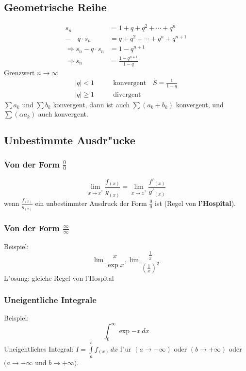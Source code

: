 \subsection{Geometrische Reihe}
\begin{align}
       s_n        & = 1 + q + q^2 + \cdots + q^n \\
-\quad q\cdot s_n & =     q + q^2 + \cdots + q^n + q^{n+1} \\
\Longrightarrow s_n - q \cdot s_n & = 1 - q^{n+1} \\
\Longrightarrow s_n & = \frac{1 - q^{n+1}}{1 -q}
\end{align}
Grenzwert $n\rightarrow\infty$
\begin{align}
  |q| < 1 \qquad & \text{konvergent}\quad S = \frac{1}{1-q} \\
  |q| \geq 1 \qquad & \text{divergent}
\end{align}
$\sum a_k$ und $\sum b_k$ konvergent, dann ist auch
$\sum (a_k+b_k)$ konvergent, und $\sum (\alpha a_k)$ auch konvergent.


\subsection{Unbestimmte Ausdr"ucke}
\subsubsection{Von der Form $\frac{0}{0}$}
\begin{equation}
  \lim_{x\to x^{*}} \frac{f_{(x)}}{g_{(x)}} = \lim_{x\to x^{*}}\frac{f'_{(x)}}{g'_{(x)}}
\end{equation}
wenn $\frac{f_{(x)}}{g_{(x)}}$ ein unbestimmter Ausdruck der Form $\frac{0}{0}$ ist
(Regel von \textbf{l'Hospital}).

\subsubsection{Von der Form $\frac{\infty}{\infty}$}
Beispiel:
\begin{equation}
  \lim_{} \frac{x}{\exp{x}}, \lim_{} \frac{\frac{1}{x}}{\left(\frac{1}{x}\right)^2}
\end{equation}
L"osung: gleiche Regel von l'Hospital


\subsubsection{Uneigentliche Integrale}
Beispiel:
\begin{equation}
  \int_0^\infty \exp{-x}\,dx
\end{equation}
Uneigentliches Integral: $I=\int\limits_a^b f_{(x)}\,dx$ f"ur $(a\rightarrow -\infty)$
oder $(b\rightarrow +\infty)$ oder $(a\rightarrow-\infty$
und $b\rightarrow +\infty)$.

